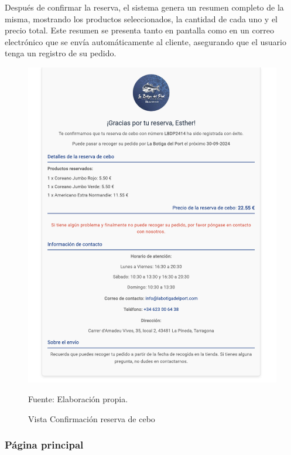 Después de confirmar la reserva, el sistema genera un resumen completo de la misma, mostrando los productos seleccionados, la cantidad de cada uno y el precio total. Este resumen se presenta tanto en pantalla como en un correo electrónico que se envía automáticamente al cliente, asegurando que el usuario tenga un registro de su pedido.

\begin{figure}[H]
\begin{center}
\includegraphics[scale=0.7]{./Images/vistaConfirmacionReservaCebo.png}
\caption{Vista Confirmación reserva de cebo} Fuente: Elaboración propia.

\label{fig:fig1}

\end{center}
\end{figure}

\subsubsection{Página principal}\label{subsec5.1.1.4}

